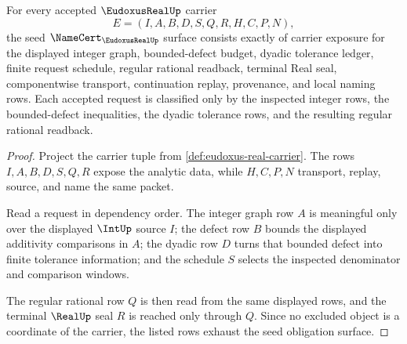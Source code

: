 \begin{theorem}
\label{thm:eudoxus-real-namecert-obligations}
For every accepted $\EudoxusRealUp$ carrier
$$
E=(I,A,B,D,S,Q,R,H,C,P,N),
$$
the seed $\NameCert_{\EudoxusRealUp}$ surface consists exactly of carrier exposure for the displayed integer graph, bounded-defect budget, dyadic tolerance ledger, finite request schedule, regular rational readback, terminal Real seal, componentwise transport, continuation replay, provenance, and local naming rows. Each accepted request is classified only by the inspected integer rows, the bounded-defect inequalities, the dyadic tolerance rows, and the resulting regular rational readback.
\end{theorem}
\begin{proof}
Project the carrier tuple from \autoref{def:eudoxus-real-carrier}. The rows $I,A,B,D,S,Q,R$ expose the analytic data, while $H,C,P,N$ transport, replay, source, and name the same packet.

Read a request in dependency order. The integer graph row $A$ is meaningful only over the displayed $\IntUp$ source $I$; the defect row $B$ bounds the displayed additivity comparisons in $A$; the dyadic row $D$ turns that bounded defect into finite tolerance information; and the schedule $S$ selects the inspected denominator and comparison windows.

The regular rational row $Q$ is then read from the same displayed rows, and the terminal $\RealUp$ seal $R$ is reached only through $Q$. Since no excluded object is a coordinate of the carrier, the listed rows exhaust the seed obligation surface.
\end{proof}

